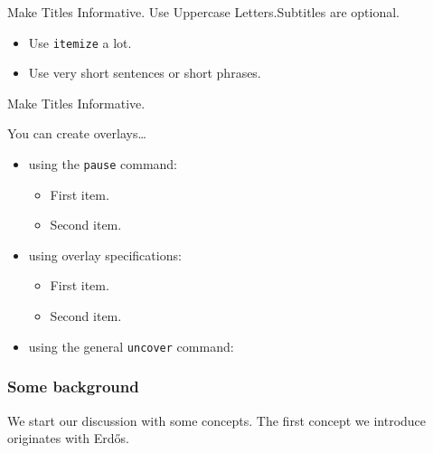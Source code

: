 \documentclass[10pt]{beamer}
\begin{document}
\begin{frame}{Make Titles Informative. Use Uppercase Letters.}{Subtitles are optional.}

  \begin{itemize}
  \item
    Use \texttt{itemize} a lot.
  \item
    Use very short sentences or short phrases.
  \end{itemize}
\end{frame}

\begin{frame}{Make Titles Informative.}

  You can create overlays\dots
  \begin{itemize}
  \item using the \texttt{pause} command:
    \begin{itemize}
    \item
      First item.
      \pause
    \item    
      Second item.
    \end{itemize}
  \item
    using overlay specifications:
    \begin{itemize}
    \item<3->
      First item.
    \item<4->
      Second item.
    \end{itemize}
  \item
    using the general \texttt{uncover} command:
    \begin{itemize}
    \end{itemize}
  \end{itemize}
\end{frame}

 \begin{frame}
\frametitle{Some background}
We start our discussion with some concepts.
\pause
The first concept we introduce originates with Erd\H os.
\end{frame}
\end{document}
